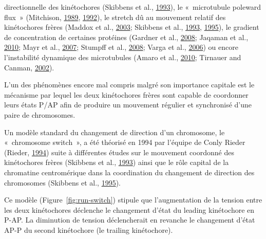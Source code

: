 \documentclass[12pt,a4paper,twoside,openright]{book}
\begin{document}
\begin{itemize}
  directionnelle des kinétochores (Skibbens et al.,
  \protect\hyperlink{ref-Skibbens1993}{1993}), le «~microtubule poleward
  flux~» (Mitchison, \protect\hyperlink{ref-Mitchison1989}{1989},
  \protect\hyperlink{ref-Mitchison1992}{1992}), le stretch dû au
  mouvement relatif des kinétochores frères (Maddox et al.,
  \protect\hyperlink{ref-Maddox2003}{2003}; Skibbens et al.,
  \protect\hyperlink{ref-Skibbens1993}{1993},
  \protect\hyperlink{ref-Skibbens1995}{1995}), le gradient de
  concentration de certaines protéines (Gardner et al.,
  \protect\hyperlink{ref-Gardner2008a}{2008}; Jaqaman et al.,
  \protect\hyperlink{ref-Jaqaman2010}{2010}; Mayr et al.,
  \protect\hyperlink{ref-Mayr2007}{2007}; Stumpff et al.,
  \protect\hyperlink{ref-Stumpff2008}{2008}; Varga et al.,
  \protect\hyperlink{ref-Varga2006}{2006}) ou encore l'instabilité
  dynamique des microtubules (Amaro et al.,
  \protect\hyperlink{ref-Amaro2010a}{2010}; Tirnauer and Canman,
  \protect\hyperlink{ref-Tirnauer2002}{2002}).
\end{itemize}

L'un des phénomènes encore mal compris malgré son importance capitale
est le mécanisme par lequel les deux kinétochores frères sont capable de
coordonner leurs états P/AP afin de produire un mouvement régulier et
synchronisé d'une paire de chromosomes.

Un modèle standard du changement de direction d'un chromosome, le
«~chromosome switch~», a été théorisé en 1994 par l'équipe de Conly
Rieder (Rieder, \protect\hyperlink{ref-Rieder1994}{1994}) suite à
différentes études sur le mouvement coordonné des kinétochores frères
(Skibbens et al., \protect\hyperlink{ref-Skibbens1993}{1993}) ainsi que
le rôle capital de la chromatine centromérique dans la coordination du
changement de direction des chromosomes (Skibbens et al.,
\protect\hyperlink{ref-Skibbens1995}{1995}).

Ce modèle (Figure~\ref{fig:run-switch}) stipule que l'augmentation de la
tension entre les deux kinétochores déclenche le changement d'état du
leading kinétochore en P-AP. La diminution de tension déclencherait en
revanche le changement d'état AP-P du second kinétochore (le trailing
kinétochore).
\end{document}
